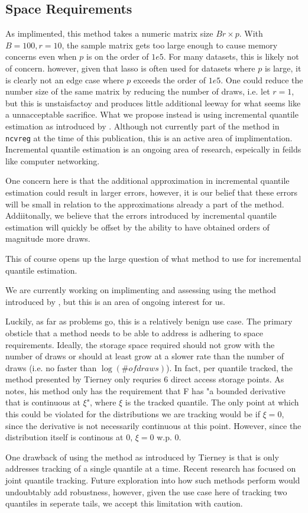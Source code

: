 \subsection{Space Requirements}

As implimented, this method takes a numeric matrix size $Br \times p$. With $B = 100, r = 10$, the sample matrix gets too large enough to cause memory concerns even when $p$ is on the order of $1e5$. For many datasets, this is likely not of concern. however, given that lasso is often used for datasets where $p$ is large, it is clearly not an edge case where $p$ exceeds the order of $1e5$. One could reduce the number size of the same matrix by reducing the number of draws, i.e. let $r = 1$, but this is unstaisfactoy and produces little additional leeway for what seems like a unnacceptable sacrifice. What we propose instead is using incremental quantile estimation as introduced by \cite{Tierney1983}. Although not currently part of the method in \texttt{ncvreg} at the time of this publication, this is an active area of implimentation. Incremental quantile estimation is an ongoing area of research, espeically in feilds like computer networking.

One concern here is that the additional approximation in incremental quantile estimation could result in larger errors, however, it is our belief that these errors will be small in relation to the approximations already a part of the method. Addiitonally, we believe that the errors introduced by incremental quantile estimation will quickly be offset by the ability to have obtained orders of magnitude more draws.

This of course opens up the large question of what method to use for incremental quantile estimation.

We are currently working on implimenting and assessing using the method introduced by \cite{Tierney1983}, but this is an area of ongoing interest for us.

Luckily, as far as problems go, this is a relatively benign use case. The primary obsticle that a method needs to be able to address is adhering to space requirements. Ideally, the storage space required should not grow with the number of draws or should at least grow at a slower rate than the number of draws (i.e. no faster than $\log(\# of draws)$). In fact, per quantile tracked, the method presented by Tierney only requries 6 direct access storage points. As \cite{Tierney1983} notes, his method only has the requirement that F has "a bounded derivative that is continuous at $\xi$", where $\xi$ is the tracked quantile. The only point at which this could be violated for the distributions we are tracking would be if $\xi = 0$, since the derivative is not necessarily continuous at this point. However, since the distribution itself is continous at 0, $\xi = 0$ w.p. 0.

One drawback of using the method as introduced by Tierney is that is only addresses tracking of a single quantile at a time. Recent research has focused on joint quantile tracking. Future exploration into how such methods perform would undoubtably add robustness, however, given the use case here of tracking two quantiles in seperate tails, we accept this limitation with caution.
